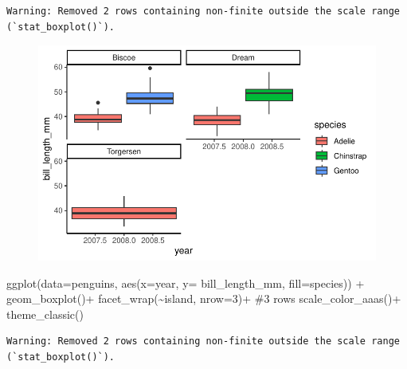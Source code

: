 \documentclass[
  letterpaper,
  DIV=11,
  numbers=noendperiod]{scrartcl}
\newenvironment{Shaded}{\begin{snugshade}}{\end{snugshade}}
\newcommand{\AttributeTok}[1]{\textcolor[rgb]{0.40,0.45,0.13}{#1}}
\newcommand{\CommentTok}[1]{\textcolor[rgb]{0.37,0.37,0.37}{#1}}
\newcommand{\DecValTok}[1]{\textcolor[rgb]{0.68,0.00,0.00}{#1}}
\newcommand{\FunctionTok}[1]{\textcolor[rgb]{0.28,0.35,0.67}{#1}}
\newcommand{\NormalTok}[1]{\textcolor[rgb]{0.00,0.23,0.31}{#1}}
\newcommand{\SpecialCharTok}[1]{\textcolor[rgb]{0.37,0.37,0.37}{#1}}
\begin{document}
\begin{verbatim}
Warning: Removed 2 rows containing non-finite outside the scale range
(`stat_boxplot()`).
\end{verbatim}

\begin{figure}[H]

{\centering \includegraphics{Lab_2_files/figure-pdf/unnamed-chunk-34-1.pdf}

}

\end{figure}

\begin{Shaded}
\begin{Highlighting}[]
\FunctionTok{ggplot}\NormalTok{(}\AttributeTok{data=}\NormalTok{penguins, }\FunctionTok{aes}\NormalTok{(}\AttributeTok{x=}\NormalTok{year, }\AttributeTok{y=}\NormalTok{ bill\_length\_mm, }\AttributeTok{fill=}\NormalTok{species)) }\SpecialCharTok{+}
  \FunctionTok{geom\_boxplot}\NormalTok{()}\SpecialCharTok{+}
  \FunctionTok{facet\_wrap}\NormalTok{(}\SpecialCharTok{\textasciitilde{}}\NormalTok{island, }\AttributeTok{nrow=}\DecValTok{3}\NormalTok{)}\SpecialCharTok{+} \CommentTok{\#3 rows}
  \FunctionTok{scale\_color\_aaas}\NormalTok{()}\SpecialCharTok{+}
  \FunctionTok{theme\_classic}\NormalTok{()}
\end{Highlighting}
\end{Shaded}

\begin{verbatim}
Warning: Removed 2 rows containing non-finite outside the scale range
(`stat_boxplot()`).
\end{verbatim}
\end{document}
